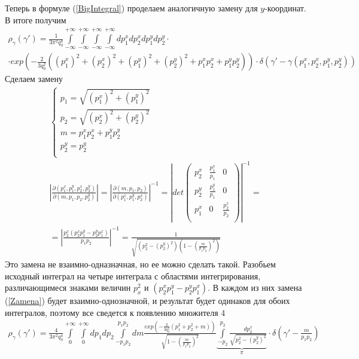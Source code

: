 \documentclass[12pt]{article}
\renewcommand{\l}{\left( }
\renewcommand{\r}{\right) }
\newcommand{\pd}{\partial}
\newcommand{\br}[1]{\l {#1} \r}
\newcommand{\rint}{\int\limits_{-\infty}^{+\infty}}
\newcommand{\jacobian}[2]{\frac{\pd \br{#1}}{\pd \br{#2}}}
\newcommand{\abs}[1]{\left| #1 \right|}
\begin{document}
Теперь в формуле (\ref{BigIntegral}) проделаем аналогичную замену для $y$-координат. В итоге получим
\begin{gather}
\rho_\gamma \br{\gamma'} = \frac{1}{3 \pi^2 q_0^4} \rint \rint \rint \rint dp_1^x dp_2^x dp_1^y dp_2^y \cdot \nonumber \\
\cdot exp \br{-\frac{2}{3q_0^2} \br{\br{p_1^x}^2 + \br{p_2^x}^2 + \br{p_1^y}^2 + \br{p_2^y}^2 + p_1^x p_2^x + p_1^y p_2^y}} \cdot \delta \br{\gamma' - \gamma \br{p_1^x, p_2^x, p_1^y, p_2^y}}
\end{gather}
Сделаем замену
\begin{gather}
\begin{cases}
\label{Zamena}
p_1 = \sqrt{\br{p_1^x}^2 + \br{p_1^y}^2} \\
p_2 = \sqrt{\br{p_2^x}^2 + \br{p_2^y}^2} \\
m = p_1^x p_2^x + p_1^y p_2^y \\
p_2^y = p_2^y \\
\end{cases} \\
\abs{\jacobian{p_1^x, p_1^y, p_2^x, p_2^y}{m, p_1, p_2, p_2^y}} = \abs{\jacobian{m, p_1, p_2}{p_1^x, p_1^y, p_2^x}}^{-1} = \abs{ det
\begin{pmatrix}
p_2^x & \frac{p_1^x}{p_1} & 0 \\
p_2^y & \frac{p_1^y}{p_1} & 0 \\
p_1^x & 0 & \frac{p_2^x}{p_2} \\
\end{pmatrix}
}^{-1} = \nonumber \\
 = \abs{\frac{p_2^x\br{p_2^x p_1^y - p_2^y p_1^x}}{p_1 p_2}}^{-1} = \frac{1}{\sqrt{\br{p_2^2 - \br{p_2^y}^2} \br{1 - \br{\frac{m}{p_1 p_2}}^2}}}
\end{gather}
Это замена не взаимно-одназначная, но ее можно сделать такой. Разобьем исходный интеграл на четыре интеграла с областями интегрирования, различающимеся знаками величин $p_x^2$ и $\br{p_2^x p_1^y - p_2^y p_1^x}$. В каждом из них замена (\ref{Zamena}) будет взаимно-однозначной, и результат будет одинаков для обоих интегралов, поэтому все сведется к появлению множителя 4
\begin{gather}
\rho_\gamma \br{\gamma'} = \frac{4}{3 \pi^2 q_0^4} \int\limits_0^{+\infty} \int\limits_0^{+\infty} dp_1 dp_2 \int\limits_{-p_1 p_2}^{p_1 p_2} dm \frac{exp \br{-\frac{2}{3q_0^2}\br{p_1^2 + p_2^2 + m}}}{\sqrt{1 - \br{\frac{m}{p_1 p_2}}^2}} \underbrace{\int\limits_{-p_2}^{p_2} \frac{dp_2^x}{\sqrt{p_2^2 - \br{p_2^y}^2}}}_\pi \cdot \delta \br{\gamma' - \frac{m}{p_1 p_2}}
\end{gather}
\end{document}
